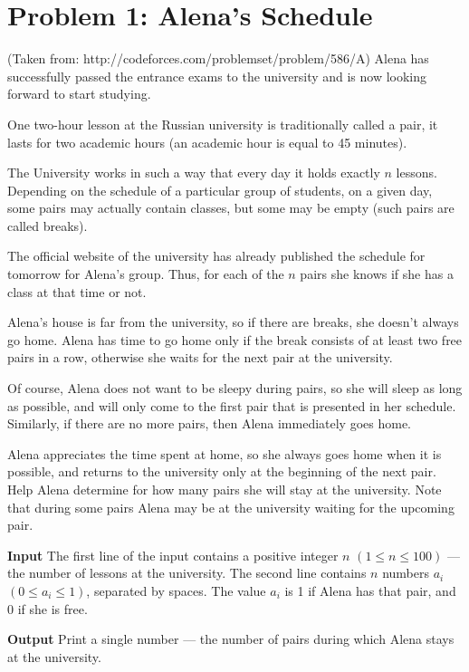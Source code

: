 \normalfont\documentclass[letterpaper,11pt]{article}
\begin{document}
\section*{Problem 1: Alena's Schedule}
(Taken from: http://codeforces.com/problemset/problem/586/A) \newline
Alena has successfully passed the entrance exams to the university and is now looking forward to start studying.

One two-hour lesson at the Russian university is traditionally called a pair, it lasts for two academic hours (an academic hour is equal to 45 minutes).

The University works in such a way that every day it holds exactly $n$ lessons. Depending on the schedule of a particular group of students, on a given day, some pairs may actually contain classes, but some may be empty (such pairs are called breaks).

The official website of the university has already published the schedule for tomorrow for Alena's group. Thus, for each of the $n$ pairs she knows if she has  a class at that time or not.

Alena's house is far from the university, so if there are breaks, she doesn't always go home. Alena has time to go home only if the break consists of at least two free pairs in a row, otherwise she waits for the next pair at the university.

Of course, Alena does not want to be sleepy during pairs, so she will sleep as long as possible, and will only come to the first pair that is presented in her schedule. Similarly, if there are no more pairs, then Alena immediately goes home.

Alena appreciates the time spent at home, so she always goes home when it is possible, and returns to the university only at the beginning of the next pair. Help Alena determine for how many pairs she will stay at the university. Note that during some pairs Alena may be at the university waiting for the upcoming pair.

\textbf{Input} \newline
The first line of the input contains a positive integer $n$ $(1 \leq n \leq 100)$ — the number of lessons at the university. The second line contains $n$ numbers $a_i$ $(0 \leq a_i \leq 1)$, separated by spaces. The value $a_i$ is 1 if Alena has that pair, and 0 if she is free.

\textbf{Output} \newline
Print a single number — the number of pairs during which Alena stays at the university.
\end{document}
